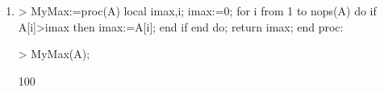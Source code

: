 \begin{enumerate}
\item
\begin{MapleInput}
> MyMax:=proc(A) 
    local imax,i; 
    imax:=0; 
    for i from 1 to nops(A) do 
      if A[i]>imax then 
          imax:=A[i];
      end if 
    end do; 
    return imax; 
  end proc:
\end{MapleInput}
\begin{MapleInput}
> MyMax(A);
\end{MapleInput}
\begin{MapleOutput}
100
\end{MapleOutput}

\end{enumerate}